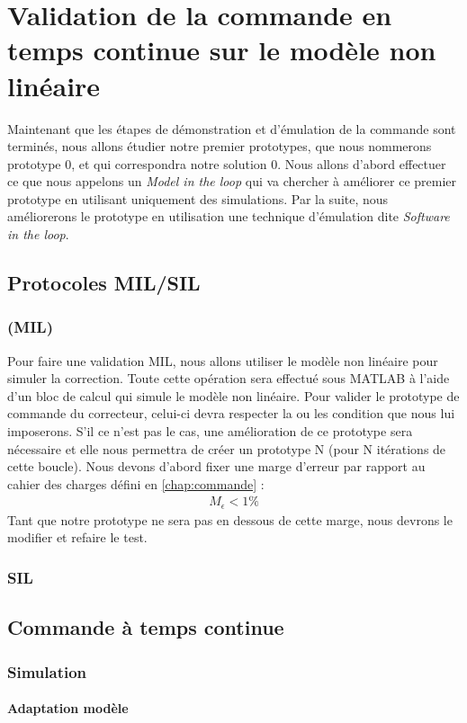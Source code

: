 \chapter{Validation de la commande en temps continue sur le modèle non linéaire}\label{ValidationCommande}
Maintenant que les étapes de démonstration et d'émulation de la commande sont terminés, nous allons étudier notre premier prototypes, que nous nommerons prototype 0, et qui correspondra  notre solution 0. Nous allons d'abord effectuer ce que nous appelons un \emph{Model in the loop} qui va chercher à améliorer ce premier prototype en utilisant uniquement des simulations. Par la suite, nous améliorerons le prototype en utilisation une technique d'émulation dite \emph{Software in the loop}.
\section{Protocoles MIL/SIL}
	\subsection{(MIL)}
	Pour faire une validation MIL, nous allons utiliser le modèle non linéaire pour simuler la correction. Toute cette opération sera effectué sous MATLAB à l'aide d'un bloc de calcul qui simule le modèle non linéaire. Pour valider le prototype de commande du correcteur, celui-ci devra respecter la ou les condition que nous lui imposerons. S'il ce n'est pas le cas, une amélioration de ce prototype sera nécessaire et elle nous permettra de créer un prototype N (pour N itérations de cette boucle). 
	Nous devons d'abord fixer une marge d'erreur par rapport au cahier des charges défini en \ref{chap:commande} : 
	\begin{align}\label{eqn_margeErreur}
		M_\epsilon < 1\%
	\end{align}
	Tant que notre prototype ne sera pas en dessous de cette marge, nous devrons le modifier et refaire le test.
	\subsection{SIL}
\section{Commande à temps continue}
	\subsection{Simulation}
		\subsubsection{Adaptation modèle}
